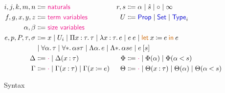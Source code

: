 \documentclass{article}
\title{}
\author{Jonathan Chan}
\newcommand{\meta}[1]{\mathsf{\textcolor{metacolour}{#1}}}
\newcommand{\ind}[1]{\mathsf{\textcolor{indcolour}{#1}}}
\newcommand{\constr}[1]{\mathsf{\textcolor{constrcolour}{#1}}}
\newcommand{\kw}[1]{\mathsf{\textcolor{kwcolour}{#1}}}
\newcommand{\kwopen}[1]{\kw{#1}\:}
\newcommand{\kwbin}[1]{\:\kw{#1}\:}
\newcommand{\annot}[2]{#1 \mathbin{:} #2}
\newcommand{\define}[2]{#1 \mathbin{\coloneqq} #2}
\newcommand{\bound}[2]{#1 \mathbin{<} #2}
\newcommand{\poly}[2]{\forall #1 \mathpunct{.} #2}
\newcommand{\fun}[3]{\Pi #1 \mathbin{:} #2 \mathpunct{.} #3}
\renewcommand{\prod}[3]{\Sigma #1 \mathbin{:} #2 \mathpunct{.} #3}
\newcommand{\lam}[3]{\lambda #1 \mathbin{:} #2 \mathpunct{.} #3}
\newcommand{\Lam}[2]{\Lambda #1 \mathpunct{.} #2}
\newcommand{\app}[2]{#1 \: #2}
\newcommand{\App}[2]{#1 \: \mathopen{[} #2 \mathclose{]}}
\newcommand{\letin}[4]{\kwopen{let} #1 \mathbin{\coloneqq} \phantom{} #3 \kwbin{in} #4}
\newcommand{\Type}[1]{\ind{Type}_{#1}}
\newcommand{\Prop}[1]{\ind{Prop}}
\newcommand{\Set}[1]{\ind{Set}}
\newcommand{\pair}[2]{\mathopen{\langle} #1 \mathpunct{,} #2 \mathclose{\rangle}}
\newcommand{\prjl}[1]{\pi_{\kw{L}} \: #1}
\newcommand{\prjr}[1]{\pi_{\kw{R}} \: #1}
\newcommand{\some}[2]{\exists #1 \mathpunct{.} #2}
\newcommand{\pack}[2]{\mathopen{(} #1 \mathpunct{,} #2 \mathclose{)}}
\newcommand{\unpack}[4]{\kwopen{let} \pack{#1}{#2} \mathbin{\coloneqq} #3 \kwbin{in} #4}
\newcommand{\refl}{\constr{refl}}
\newcommand{\equal}[3]{#1 \stackrel{#2}{=\joinrel=} #3}
\newcommand{\J}[3]{\constr{J}_{#1} \: #2 \: #3}
\newcommand{\?}{\meta{?}}
\newcommand{\mt}{\meta{\cdot}}
\theoremstyle{definition}
\begin{document}
\maketitle

\begin{figure}[!h]
    \centering
    \begin{align*}
        i, j, k, m, n &\Coloneqq \meta{naturals}
        & r, s &\Coloneqq \alpha \mid \hat{s} \mid \circ \mid \infty
        && \\
        f, g, x, y, z &\Coloneqq \meta{term ~ variables}
        & U &\Coloneqq \Prop{i} \mid \Set{i} \mid \Type{i}
        && \\
        \alpha, \beta &\Coloneqq \meta{size ~ variables} &&&& \\
        e, p, P, \tau, \sigma &\Coloneqq \mathrlap{x \mid U_{i} \mid \fun{x}{\tau}{\tau} \mid \lam{x}{\tau}{e} \mid \app{e}{e} \mid \letin{x}{\tau}{e}{e}} \\
        &\mid \mathrlap{\poly{\alpha}{\tau} \mid \poly*{\alpha}{s}{\tau} \mid \Lam{\alpha}{e} \mid \Lam*{\alpha}{s}{e} \mid \App{e}{s}} \\
        \Delta &\Coloneqq \mt \mid \Delta(\annot{x}{\tau}) & \Phi &\Coloneqq \mt \mid \Phi(\alpha) \mid \Phi(\bound{\alpha}{s}) \\
        \Gamma &\Coloneqq \mt \mid \Gamma(\annot{x}{\tau}) \mid \Gamma(\define{x}{e}) & \Theta &\Coloneqq \mt \mid \Theta(\annot{x}{\tau}) \mid \Theta(\alpha) \mid \Theta(\bound{\alpha}{s})
    \end{align*}
    \caption{Syntax}
    \label{fig:syntax}
\end{figure}
\end{document}
